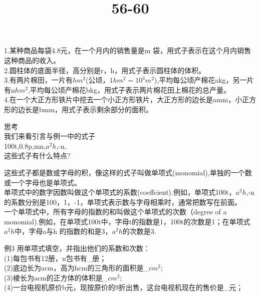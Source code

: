 \documentclass{ctexart}
\title{56-60}
\begin{document}
\maketitle
\begin{article}
\begin{ex}
1.某种商品每袋4.8元，在一个月内的销售量是m 袋，用式子表示在这个月内销售这种商品的收入。\\
2.圆柱体的底面半径，高分别是r，h，用式子表示圆柱体的体积。\\
3.有两片棉田，一片有$hm^{2}$(公顷，$1hm^{2}=10^{4}m^{2}$),平均每公顷产棉花akg，另一片有n$hm^{2}$,平均每公顷产棉花bkg，用式子表示两片棉花田上棉花的总产量。\\
4.在一个大正方形铁片中挖去一个小正方形铁片，大正方形的边长是amm，小正方形的边长是bmm，用式子表示剩余部分的面积。\\
\end{ex}
思考\\
我们来看引言与例一中的式子\\
100t,0.8p,mn,$a^{2}h$,-n,\\
这些式子有什么特点?\\

\begin{definition}
这些式子都是数或字母的积，像这样的式子叫做单项式(monomial),单独的一个数或一个字母也是单项式。\\
单项式中的数字因数叫做这个单项式的系数(coeffcient).例如，单项式100t，$a^{2}h$,-n的系数分别是100，1，-1，单项式表示数与字母相乘时，通常把数写在前面。\\
一个单项式中，所有字母的指数的和叫做这个单项式的次数（degree of a monomial).例如，在单项式100t中，字母t的指数是1，100t的次数是1；在单项式$a^{2}h$中，字母a与h 的指数的和是3，$a^{2}h$的次数是3.\\
\end{definition}
\begin{example}
例3 用单项式填空，并指出他们的系数和次数：\\
(1)每包书有12册，n包书有\_册；\\
(2)底边长为acm，高为hcm的三角形的面积是\_$cm^{2}$;\\
(3)棱长为acm的正方体的体积是\_$cm^{2}$;\\
(4)一台电视机原价b元，现按原价的9折出售，这台电视机现在的售价是\_元；\\
\end{example}
\end{article}
\end{document}
